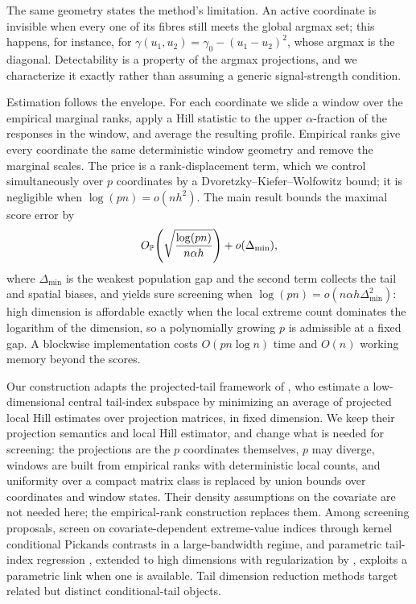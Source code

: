 The same geometry states the method's limitation. An active coordinate is
invisible when every one of its fibres still meets the global argmax set;
this happens, for instance, for $\gamma(u_1,u_2)=\gamma_0-(u_1-u_2)^2$,
whose argmax is the diagonal. Detectability is a property of the argmax
projections, and we characterize it exactly rather than assuming a generic
signal-strength condition.

Estimation follows the envelope. For each coordinate we slide a window over
the empirical marginal ranks, apply a Hill statistic to the upper
$\alpha$-fraction of the responses in the window, and average the resulting
profile. Empirical ranks give every coordinate the same deterministic window
geometry and remove the marginal scales. The price is a rank-displacement
term, which we control simultaneously over $p$ coordinates by a
Dvoretzky--Kiefer--Wolfowitz bound; it is negligible when $\log(pn)=o(nh^2)$.
The main result bounds the maximal score error by
\[
 O_{\mathbb P}\!\left(\sqrt{\frac{\log(pn)}{n\alpha h}}\right)+o(\Delta_{\min}),
\]
where $\Delta_{\min}$ is the weakest population gap and the second term
collects the tail and spatial biases, and yields sure screening when
$\log(pn)=o(n\alpha h\Delta_{\min}^2)$: high dimension is affordable
exactly when the local extreme count dominates the logarithm of the
dimension, so a polynomially growing $p$ is admissible at a fixed gap.
A blockwise implementation costs $O(pn\log n)$ time and $O(n)$ working
memory beyond the scores.

Our construction adapts the projected-tail framework of
\citet{gardesPodgorny2025}, who estimate a low-dimensional central tail-index
subspace by minimizing an average of projected local Hill estimates over
projection matrices, in fixed dimension. We keep their projection semantics
and local Hill estimator, and change what is needed for screening: the
projections are the $p$ coordinates themselves, $p$ may diverge, windows are
built from empirical ranks with deterministic local counts, and uniformity
over a compact matrix class is replaced by union bounds over coordinates and
window states. Their density assumptions on the covariate are not needed
here; the empirical-rank construction replaces them. Among screening
proposals, \citet{yoshidaUmezu2026} screen on covariate-dependent
extreme-value indices through kernel conditional Pickands contrasts in a
large-bandwidth regime, and parametric tail-index regression \citep{wangTsai2009}, extended to
high dimensions with regularization by \citet{sasakiTaoWang2026},
exploits a parametric link when one is available. Tail dimension reduction methods
\citep{gardes2018,aghbalouEtAl2024,bousebataEtAl2023,arbelEtAl2024} target
related but distinct conditional-tail objects.

